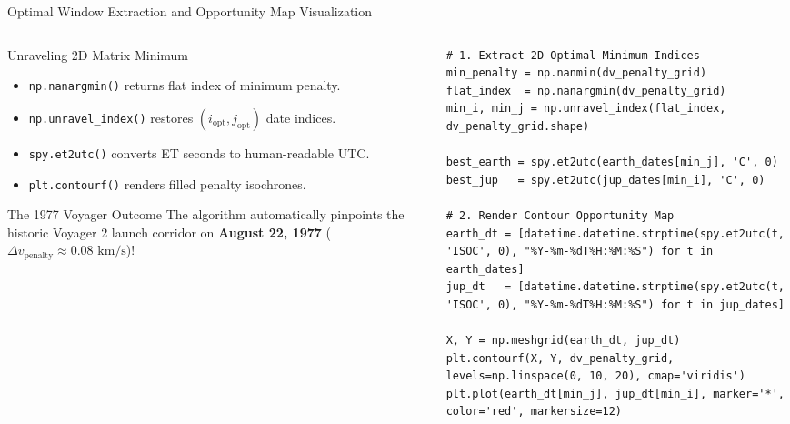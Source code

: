 \documentclass[aspectratio=169, 10pt]{beamer}
\begin{document}
\begin{frame}[fragile]{Optimal Window Extraction and Opportunity Map Visualization}
    \begin{columns}[t]
        \begin{column}{0.50\textwidth}
            \begin{block}{Unraveling 2D Matrix Minimum}
                \scriptsize
                \begin{itemize}\setlength{\itemsep}{1.5pt}
                    \item \texttt{np.nanargmin()} returns flat index of minimum penalty.
                    \item \texttt{np.unravel\_index()} restores $(i_{\text{opt}}, j_{\text{opt}})$ date indices.
                    \item \texttt{spy.et2utc()} converts ET seconds to human-readable UTC.
                    \item \texttt{plt.contourf()} renders filled penalty isochrones.
                \end{itemize}
            \end{block}
            \vspace{-0.1cm}
            \begin{exampleblock}{The 1977 Voyager Outcome}
                \scriptsize
                The algorithm automatically pinpoints the historic Voyager 2 launch corridor on \textbf{August 22, 1977} ($\Delta v_{\text{penalty}} \approx 0.08\text{ km/s}$)!
            \end{exampleblock}
        \end{column}

        \begin{column}{0.48\textwidth}
\begin{lstlisting}[style=pythoncode]
# 1. Extract 2D Optimal Minimum Indices
min_penalty = np.nanmin(dv_penalty_grid)
flat_index  = np.nanargmin(dv_penalty_grid)
min_i, min_j = np.unravel_index(flat_index, dv_penalty_grid.shape)

best_earth = spy.et2utc(earth_dates[min_j], 'C', 0)
best_jup   = spy.et2utc(jup_dates[min_i], 'C', 0)

# 2. Render Contour Opportunity Map
earth_dt = [datetime.datetime.strptime(spy.et2utc(t, 'ISOC', 0), "%Y-%m-%dT%H:%M:%S") for t in earth_dates]
jup_dt   = [datetime.datetime.strptime(spy.et2utc(t, 'ISOC', 0), "%Y-%m-%dT%H:%M:%S") for t in jup_dates]

X, Y = np.meshgrid(earth_dt, jup_dt)
plt.contourf(X, Y, dv_penalty_grid, levels=np.linspace(0, 10, 20), cmap='viridis')
plt.plot(earth_dt[min_j], jup_dt[min_i], marker='*', color='red', markersize=12)
\end{lstlisting}
        \end{column}
    \end{columns}
\end{frame}
\end{document}
